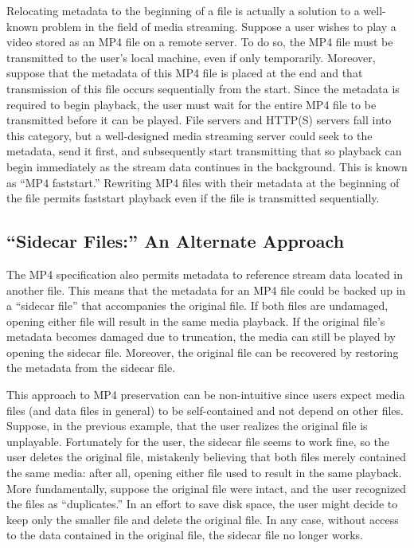 Relocating metadata to the beginning of a file is actually a solution to a well-known problem in the field of media streaming. Suppose a user wishes to play a video stored as an MP4 file on a remote server. To do so, the MP4 file must be transmitted to the user's local machine, even if only temporarily. Moreover, suppose that the metadata of this MP4 file is placed at the end and that transmission of this file occurs sequentially from the start. Since the metadata is required to begin playback, the user must wait for the entire MP4 file to be transmitted before it can be played. File servers and HTTP(S) servers fall into this category, but a well-designed media streaming server could seek to the metadata, send it first, and subsequently start transmitting that so playback can begin immediately as the stream data continues in the background. This is known as ``MP4 faststart.'' Rewriting MP4 files with their metadata at the beginning of the file permits faststart playback even if the file is transmitted sequentially.

\subsection{``Sidecar Files:'' An Alternate Approach}

The MP4 specification also permits metadata to reference stream data located in another file. This means that the metadata for an MP4 file could be backed up in a ``sidecar file'' that accompanies the original file. If both files are undamaged, opening either file will result in the same media playback. If the original file's metadata becomes damaged due to truncation, the media can still be played by opening the sidecar file. Moreover, the original file can be recovered by restoring the metadata from the sidecar file.

This approach to MP4 preservation can be non-intuitive since users expect media files (and data files in general) to be self-contained and not depend on other files. Suppose, in the previous example, that the user realizes the original file is unplayable. Fortunately for the user, the sidecar file seems to work fine, so the user deletes the original file, mistakenly believing that both files merely contained the same media: after all, opening either file used to result in the same playback. More fundamentally, suppose the original file were intact, and the user recognized the files as ``duplicates.'' In an effort to save disk space, the user might decide to keep only the smaller file and delete the original file. In any case, without access to the data contained in the original file, the sidecar file no longer works.

